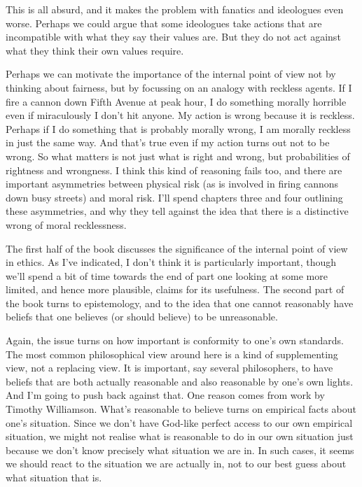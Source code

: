 \documentclass[
  10pt,
  letterpaper,
  twoside]{scrbook}
\begin{document}
This is all absurd, and it makes the problem with fanatics and
ideologues even worse. Perhaps we could argue that some ideologues take
actions that are incompatible with what they say their values are. But
they do not act against what they think their own values require.

Perhaps we can motivate the importance of the internal point of view not
by thinking about fairness, but by focussing on an analogy with reckless
agents. If I fire a cannon down Fifth Avenue at peak hour, I do
something morally horrible even if miraculously I don't hit anyone. My
action is wrong because it is reckless. Perhaps if I do something that
is probably morally wrong, I am morally reckless in just the same way.
And that's true even if my action turns out not to be wrong. So what
matters is not just what is right and wrong, but probabilities of
rightness and wrongness. I think this kind of reasoning fails too, and
there are important asymmetries between physical risk (as is involved in
firing cannons down busy streets) and moral risk. I'll spend chapters
three and four outlining these asymmetries, and why they tell against
the idea that there is a distinctive wrong of moral recklessness.

The first half of the book discusses the significance of the internal
point of view in ethics. As I've indicated, I don't think it is
particularly important, though we'll spend a bit of time towards the end
of part one looking at some more limited, and hence more plausible,
claims for its usefulness. The second part of the book turns to
epistemology, and to the idea that one cannot reasonably have beliefs
that one believes (or should believe) to be unreasonable.

Again, the issue turns on how important is conformity to one's own
standards. The most common philosophical view around here is a kind of
supplementing view, not a replacing view. It is important, say several
philosophers, to have beliefs that are both actually reasonable and also
reasonable by one's own lights. And I'm going to push back against that.
One reason comes from work by Timothy Williamson. What's reasonable to
believe turns on empirical facts about one's situation. Since we don't
have God-like perfect access to our own empirical situation, we might
not realise what is reasonable to do in our own situation just because
we don't know precisely what situation we are in. In such cases, it
seems we should react to the situation we are actually in, not to our
best guess about what situation that is.
\end{document}
